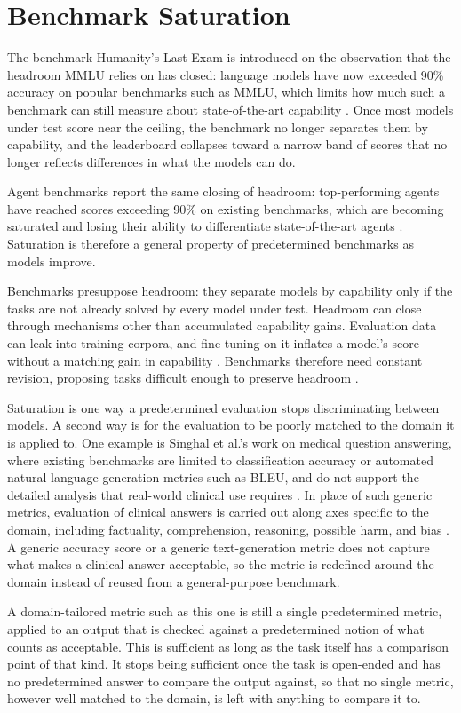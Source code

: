 \section{Benchmark Saturation}
\label{sec:benchmark-saturation}

The benchmark Humanity's Last Exam is introduced on the observation that the headroom MMLU relies on has closed: language models have now exceeded 90\% accuracy on popular benchmarks such as MMLU, which limits how much such a benchmark can still measure about state-of-the-art capability \cite{phanHumanitysLastExam2025}. Once most models under test score near the ceiling, the benchmark no longer separates them by capability, and the leaderboard collapses toward a narrow band of scores that no longer reflects differences in what the models can do.

Agent benchmarks report the same closing of headroom: top-performing agents have reached scores exceeding 90\% on existing benchmarks, which are becoming saturated and losing their ability to differentiate state-of-the-art agents \cite{guoSelfEvolvingBenchmarksSynthesizing2026}. Saturation is therefore a general property of predetermined benchmarks as models improve.

Benchmarks presuppose headroom: they separate models by capability only if the tasks are not already solved by every model under test. Headroom can close through mechanisms other than accumulated capability gains. Evaluation data can leak into training corpora, and fine-tuning on it inflates a model's score without a matching gain in capability \cite{akhtarWhenAIBenchmarks2026}. Benchmarks therefore need constant revision, proposing tasks difficult enough to preserve headroom \cite{akhtarWhenAIBenchmarks2026}.

Saturation is one way a predetermined evaluation stops discriminating between models. A second way is for the evaluation to be poorly matched to the domain it is applied to. One example is Singhal et al.'s work on medical question answering, where existing benchmarks are limited to classification accuracy or automated natural language generation metrics such as BLEU, and do not support the detailed analysis that real-world clinical use requires \cite{singhalLargeLanguageModels2023}. In place of such generic metrics, evaluation of clinical answers is carried out along axes specific to the domain, including factuality, comprehension, reasoning, possible harm, and bias \cite{singhalLargeLanguageModels2023}. A generic accuracy score or a generic text-generation metric does not capture what makes a clinical answer acceptable, so the metric is redefined around the domain instead of reused from a general-purpose benchmark.

A domain-tailored metric such as this one is still a single predetermined metric, applied to an output that is checked against a predetermined notion of what counts as acceptable. This is sufficient as long as the task itself has a comparison point of that kind. It stops being sufficient once the task is open-ended and has no predetermined answer to compare the output against, so that no single metric, however well matched to the domain, is left with anything to compare it to.
